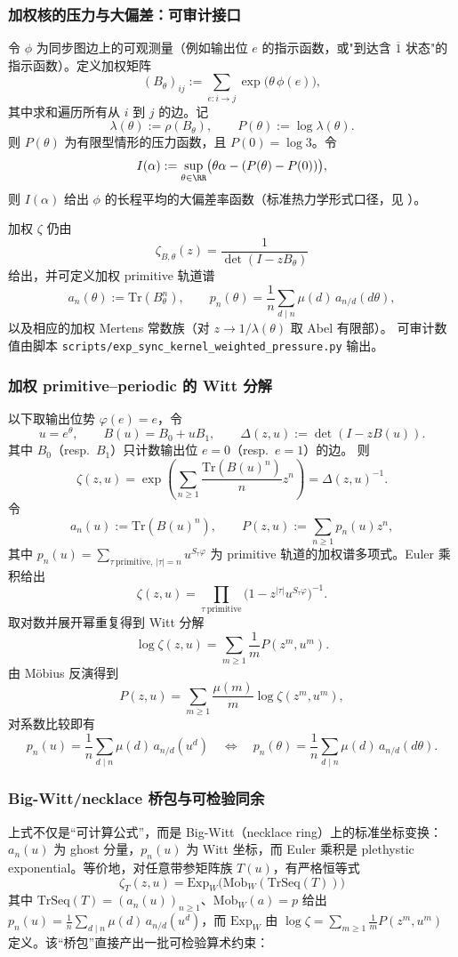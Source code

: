 \subsubsection{加权核的压力与大偏差：可审计接口}\label{subsubsec:sync-kernel-weighted-pressure-ldp}
令 $\phi$ 为同步图边上的可观测量（例如输出位 $e$ 的指示函数，或"到达含 $\overline{1}$ 状态"的指示函数）。定义加权矩阵
\[
(B_\theta)_{ij}:=\sum_{e:i\to j}\exp\bigl(\theta\,\phi(e)\bigr),
\]
其中求和遍历所有从 $i$ 到 $j$ 的边。记
\[
\lambda(\theta):=\rho(B_\theta),\qquad P(\theta):=\log\lambda(\theta).
\]
则 $P(\theta)$ 为有限型情形的压力函数，且 $P(0)=\log 3$。令
\[
I(\alpha):=\sup_{\theta\in\RR}\bigl(\theta\alpha-(P(\theta)-P(0))\bigr),
\]
则 $I(\alpha)$ 给出 $\phi$ 的长程平均的大偏差率函数（标准热力学形式口径，见 \cite{Ruelle1978Thermodynamic,ParryPollicott1990Zeta}）。

加权 $\zeta$ 仍由
\[
\zeta_{B,\theta}(z)=\frac{1}{\det(I-zB_\theta)}
\]
给出，并可定义加权 primitive 轨道谱
\[
a_n(\theta):=\mathrm{Tr}(B_\theta^n),\qquad
p_n(\theta)=\frac{1}{n}\sum_{d\mid n}\mu(d)\,a_{n/d}(d\theta),
\]
以及相应的加权 Mertens 常数族（对 $z\to 1/\lambda(\theta)$ 取 Abel 有限部）。
可审计数值由脚本 \texttt{scripts/exp\_sync\_kernel\_weighted\_pressure.py} 输出。

\subsubsection{加权 primitive--periodic 的 Witt 分解}\label{app:witt-weighted}
以下取输出位势 $\varphi(e)=e$，令
\[
u=e^\theta,\qquad B(u)=B_0+uB_1,\qquad \Delta(z,u):=\det(I-zB(u)).
\]
其中 $B_0$（resp.\ $B_1$）只计数输出位 $e=0$（resp.\ $e=1$）的边。
则
\[
\zeta(z,u)=\exp\!\left(\sum_{n\ge 1}\frac{\mathrm{Tr}(B(u)^n)}{n}z^n\right)=\Delta(z,u)^{-1}.
\]
令
\[
a_n(u):=\mathrm{Tr}(B(u)^n),\qquad
P(z,u):=\sum_{n\ge 1}p_n(u)z^n,
\]
其中
\(
p_n(u)=\sum_{\tau\ \mathrm{primitive},\,|\tau|=n}u^{S_\tau\varphi}
\)
为 primitive 轨道的加权谱多项式。Euler 乘积给出
\[
\zeta(z,u)=\prod_{\tau\ \mathrm{primitive}}\bigl(1-z^{|\tau|}u^{S_\tau\varphi}\bigr)^{-1}.
\]
取对数并展开幂重复得到 Witt 分解
\[
\log\zeta(z,u)=\sum_{m\ge 1}\frac{1}{m}P(z^m,u^m).
\]
由 Möbius 反演得到
\[
P(z,u)=\sum_{m\ge 1}\frac{\mu(m)}{m}\log\zeta(z^m,u^m),
\]
对系数比较即有
\[
p_n(u)=\frac{1}{n}\sum_{d\mid n}\mu(d)\,a_{n/d}(u^d)
\quad\Longleftrightarrow\quad
p_n(\theta)=\frac{1}{n}\sum_{d\mid n}\mu(d)\,a_{n/d}(d\theta).
\]

\subsubsection{Big-Witt/necklace 桥包与可检验同余}\label{app:witt-bridge-package}
上式不仅是“可计算公式”，而是 Big-Witt（necklace ring）上的标准坐标变换：$a_n(u)$ 为 ghost 分量，$p_n(u)$ 为 Witt 坐标，而 Euler 乘积是 plethystic exponential。等价地，对任意带参矩阵族 $T(u)$，有严格恒等式
\[
\boxed{\ \zeta_T(z,u)=\mathrm{Exp}_W\bigl(\mathrm{Mob}_W(\mathrm{TrSeq}(T))\bigr)\ }
\]
其中 $\mathrm{TrSeq}(T)=(a_n(u))_{n\ge 1}$、$\mathrm{Mob}_W(a)=p$ 给出 $p_n(u)=\frac1n\sum_{d\mid n}\mu(d)\,a_{n/d}(u^d)$，而 $\mathrm{Exp}_W$ 由
\(
\log\zeta=\sum_{m\ge 1}\frac{1}{m}P(z^m,u^m)
\)
定义。该“桥包”直接产出一批可检验算术约束：

